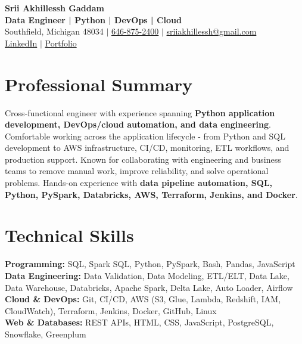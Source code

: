 \documentclass[letterpaper,10pt]{article}
\begin{document}
\fontsize{9.35pt}{10.45pt}\selectfont

\begin{center}
    {\LARGE \textbf{Srii Akhillessh Gaddam}} \\[-1pt]
    \textbf{Data Engineer | Python | DevOps | Cloud} \\[2pt]
    Southfield, Michigan 48034 $|$
    \href{tel:6468752400}{646-875-2400} $|$
    \href{mailto:sriiakhillessh@gmail.com}{sriiakhillessh@gmail.com} \\[1pt]
    \href{https://www.linkedin.com/in/srii-akhiilessh-gaddam-b48668191/}{LinkedIn} $|$
    \href{https://sriiakhillesshg.github.io/portfolio/}{Portfolio}
\end{center}
\vspace{-8pt}

\section{Professional Summary}
\small{Cross-functional engineer with experience spanning \textbf{Python application development, DevOps/cloud automation, and data engineering}. Comfortable working across the application lifecycle - from Python and SQL development to AWS infrastructure, CI/CD, monitoring, ETL workflows, and production support. Known for collaborating with engineering and business teams to remove manual work, improve reliability, and solve operational problems. Hands-on experience with \textbf{data pipeline automation, SQL, Python, PySpark, Databricks, AWS, Terraform, Jenkins, and Docker}.}

\section{Technical Skills}
\small{
\textbf{Programming:} SQL, Spark SQL, Python, PySpark, Bash, Pandas, JavaScript \\
\textbf{Data Engineering:} Data Validation, Data Modeling, ETL/ELT, Data Lake, Data Warehouse, Databricks, Apache Spark, Delta Lake, Auto Loader, Airflow \\
\textbf{Cloud \& DevOps:} Git, CI/CD, AWS (S3, Glue, Lambda, Redshift, IAM, CloudWatch), Terraform, Jenkins, Docker, GitHub, Linux \\
\textbf{Web \& Databases:} REST APIs, HTML, CSS, JavaScript, PostgreSQL, Snowflake, Greenplum
}
\end{document}
